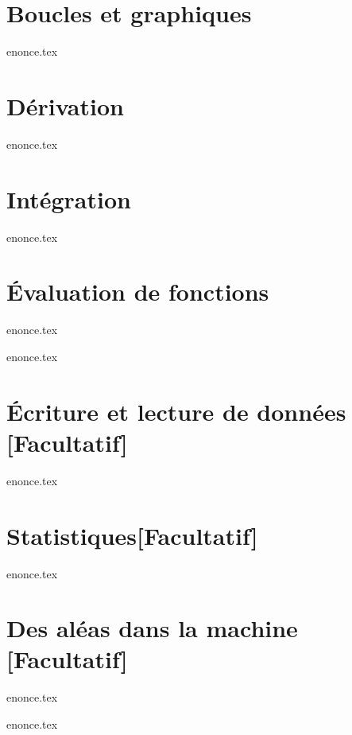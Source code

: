 \documentclass[a4paper,11pt,titlepage]{article}
\begin{document}
\section{Boucles et graphiques}
{enonce.tex}
\pagebreak






\section{Dérivation}
{enonce.tex}
\FloatBarrier
\pagebreak

\section{Intégration}
{enonce.tex}
\pagebreak

\section{Évaluation de fonctions}
{enonce.tex}
\pagebreak

{enonce.tex}
\pagebreak
\section{Écriture et lecture de données [Facultatif]}
{enonce.tex}
\pagebreak
\section{Statistiques[Facultatif]} %
{enonce.tex}
\pagebreak


\section{Des aléas dans la machine [Facultatif]}
{enonce.tex}
\pagebreak

{enonce.tex}
\pagebreak
\end{document}
